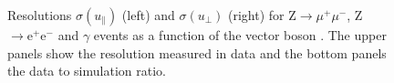 \begin{figure}[htb]
\centering
{}
\caption{Resolutions $\sigma(u_\parallel)$ (left) and $\sigma(u_\perp)$ (right) for Z$\to\mu^+\mu^-$, Z$\to\mathrm{e^+ e^-}$ and $\gamma$ events as a function of the vector boson \pt. The upper panels show the resolution measured in data and the bottom panels the data to simulation ratio.}\label{fig:metres}
\end{figure}

